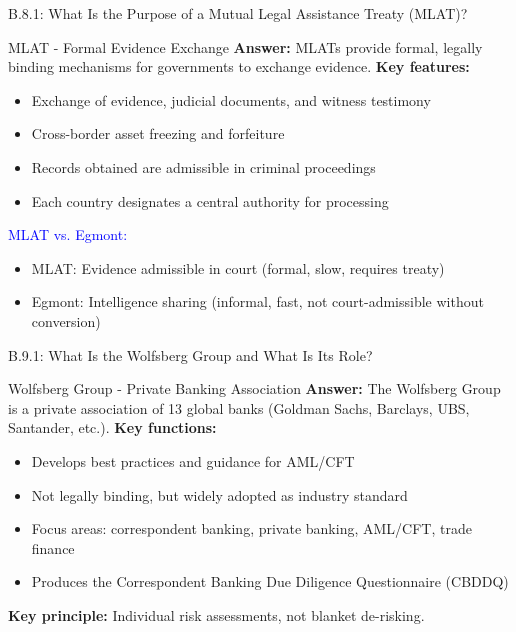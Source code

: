 \documentclass{beamer}
\begin{document}
	\begin{frame}{B.8.1: What Is the Purpose of a Mutual Legal Assistance Treaty (MLAT)?}
		\begin{block}{MLAT - Formal Evidence Exchange}
			\textbf{Answer:} MLATs provide formal, legally binding mechanisms for governments to exchange evidence.
			\vspace{0.2cm}
			\textbf{Key features:}
			\begin{itemize}
				\item Exchange of evidence, judicial documents, and witness testimony
				\item Cross-border asset freezing and forfeiture
				\item Records obtained are admissible in criminal proceedings
				\item Each country designates a central authority for processing
			\end{itemize}
			\textcolor{blue}{MLAT vs. Egmont:}
			\begin{itemize}
				\item MLAT: Evidence admissible in court (formal, slow, requires treaty)
				\item Egmont: Intelligence sharing (informal, fast, not court-admissible without conversion)
			\end{itemize}
		\end{block}
	\end{frame}
	
	
	\begin{frame}{B.9.1: What Is the Wolfsberg Group and What Is Its Role?}
		\begin{block}{Wolfsberg Group - Private Banking Association}
			\textbf{Answer:} The Wolfsberg Group is a private association of 13 global banks (Goldman Sachs, Barclays, UBS, Santander, etc.).
			\vspace{0.2cm}
			\textbf{Key functions:}
			\begin{itemize}
				\item Develops best practices and guidance for AML/CFT
				\item Not legally binding, but widely adopted as industry standard
				\item Focus areas: correspondent banking, private banking, AML/CFT, trade finance
				\item Produces the Correspondent Banking Due Diligence Questionnaire (CBDDQ)
			\end{itemize}
			\textbf{Key principle:} Individual risk assessments, not blanket de-risking.
		\end{block}
	\end{frame}
	
\end{document}
